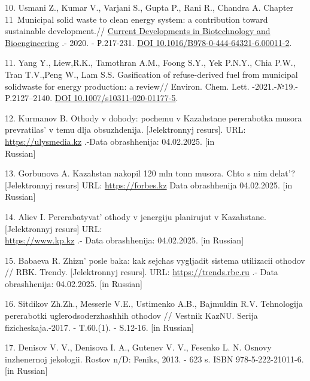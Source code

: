\begin{references}
10. Usmani Z., Kumar V., Varjani S., Gupta P., Rani R., Chandra A.
Chapter 11~Municipal solid waste to clean energy system: a
contribution toward sustainable development.//
\href{https://www.sciencedirect.com/book/9780444643216/current-developments-in-biotechnology-and-bioengineering}{Current
Developments in Biotech\-nology and Bioengineering} .- 2020. -
Р.217-231. \href{https://doi.org/10.1016/B978-0-444-64321-6.00011-2}{DOI
10.1016/B978-0-444-64321-6.00011-2}.

11. Yang Y., Liew,R.K., Tamothran A.M., Foong S.Y., Yek P.N.Y., Chia
P.W., Tran T.V.,Peng W., Lam S.S. Gasification of refuse-derived fuel
from municipal solidwaste for energy production: a review// Environ.
Chem. Lett. -2021.-№19.- P.2127--2140.
\href{https://doi.org/10.1007/s10311-020-01177-5}{DOI
10.1007/s10311-020-01177-5}.

12. Kurmanov B. Othody v dohody: pochemu v Kazahstane pererabotka musora
prevratilas'{} v temu dlja obsuzhdenija. {[}Jelektronnyj
resurs{]}. URL:
\href{https://ulysmedia.kz/analitika/11719-otkhody-v-dokhody-pochemu-v-kazakhstane-pererabotka-musora-prevratilas-v-temu-dlia-obsuzhdeniia/}{https://ulysmedia.kz} .-Data
obrashhenija: 04.02.2025. {[}in \\Russian{]}

13. Gorbunova A. Kazahstan nakopil 120 mln tonn musora. Chto s nim
delat'? {[}Jelektronnyj resurs{]} URL:
\href{https://forbes.kz/process/ecobusiness/kazahstan_nakopil_120_mln_tonn_byitovogo_musora_chto_s_nim_delat/}{https://forbes.kz}
Data obrashhenija 04.02.2025. {[}in Russian{]}

14. Aliev I. Pererabatyvat'{} othody v jenergiju
planirujut v Kazahstane. {[}Jelektronnyj resurs{]} URL:\\
\href{https://www.kp.kz/online/news/3898668/}{https://www.kp.kz} .- Data obrashhenija: 04.02.2025.
{[}in Russian{]}

15. Babaeva R. Zhizn'{} posle baka: kak sejchas vygljadit
sistema utilizacii othodov // RBK. Trendy. {[}Jelek\-tronnyj resurs{]}.
URL:
\href{https://trends.rbc.ru/trends/green/cmrm/60ad10399a794783c51ea200}{https://trends.rbc.ru} .- Data
obrashhenija: 04.02.2025. {[}in Russian{]}

16. Sitdikov Zh.Zh., Messerle V.E., Ustimenko A.B., Bajmuldin R.V.
Tehnologija pererabotki uglerod\-soderzhashhih othodov // Vestnik KazNU.
Serija fizicheskaja.-2017. - T.60.(1). - S.12-16. {[}in Russian{]}

17. Denisov V. V., Denisova I. A., Gutenev V. V., Fesenko L. N. Osnovy
inzhenernoj jekologii. Rostov n/D: Feniks, 2013. - 623 s. ISBN
978-5-222-21011-6. {[}in Russian{]}


\end{references}
